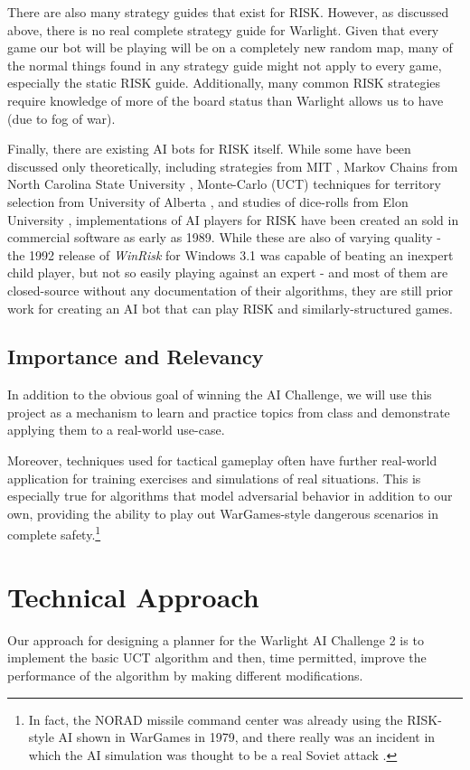\documentclass[a4paper,11pt]{article}
\begin{document}
There are also many strategy guides that exist for RISK.  However, as discussed 
above, there is no real complete strategy guide for Warlight.  Given that every 
game our bot will be playing will be on a completely new random map, many of the 
normal things found in any strategy guide might not apply to every game, especially 
the static RISK guide.  Additionally, many common RISK strategies require knowledge 
of more of the board status than Warlight allows us to have (due to fog of war).

Finally, there are existing AI bots for RISK itself.  While some have been 
discussed only theoretically, including strategies from MIT \cite{riskmit}, Markov 
Chains from North Carolina State University \cite{riskncs}, Monte-Carlo (UCT) 
techniques for territory selection from University of Alberta \cite{riskalb}, and 
studies of dice-rolls from Elon University \cite{riskelon}, implementations of AI 
players for RISK have been created an sold in commercial software as early as 1989.  
While these are also of varying quality - the 1992 release of \textit{WinRisk} for 
Windows 3.1 was capable of beating an inexpert child player, but not so easily 
playing against an expert - and most of them are closed-source without any 
documentation of their algorithms, they are still prior work for creating an AI bot 
that can play RISK and similarly-structured games.

\subsection{Importance and Relevancy}\label{sec:importance}
In addition to the obvious goal of winning the AI Challenge, we will use this
project as a mechanism to learn and practice topics from class and demonstrate
applying them to a real-world use-case.

Moreover, techniques used for tactical gameplay often have further real-world 
application for training exercises and simulations of real situations.  This is 
especially true for algorithms that model adversarial behavior in addition to our 
own, providing the ability to play out WarGames-style dangerous scenarios in 
complete safety.\footnote{In fact, the NORAD missile command center was already 
using the RISK-style AI shown in WarGames in 1979, and there really was an incident
in which the AI simulation was thought to be a real Soviet attack
\cite{wargamesreal}.}

%
\section{Technical Approach}\label{sec:approach}
Our approach for designing a planner for the Warlight AI Challenge 2 is to implement the basic UCT algorithm and then, time permitted, improve the performance of the algorithm by making different modifications.
\end{document}
